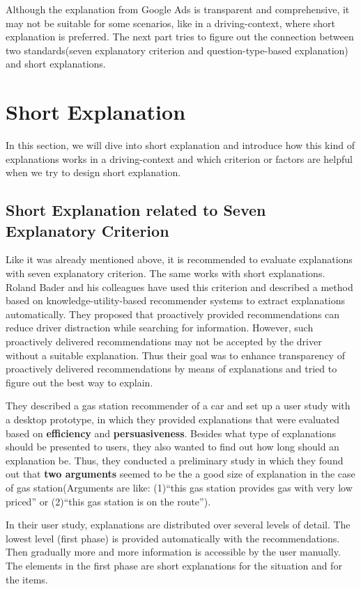         Although the explanation from Google Ads is transparent and comprehensive,
        it may not be suitable for some scenarios, like in a driving-context, where short explanation is preferred.
        The next part tries to figure out the connection between two standards(seven explanatory criterion and question-type-based explanation) 
        and short explanations.
\section{Short Explanation}
    In this section, we will dive into short explanation and introduce how this kind of explanations works in a driving-context
    and which criterion or factors are helpful when we try to design short explanation.
    \subsection{Short Explanation related to Seven Explanatory Criterion}
    \indent Like it was already mentioned above, 
    it is recommended to evaluate explanations with seven explanatory criterion. The same works with short explanations.
    Roland Bader and his colleagues have used this criterion and described a method based on knowledge-utility-based 
    recommender systems to extract explanations automatically\cite{bader122011explanations}. They proposed that 
    proactively provided recommendations can reduce driver distraction while searching for information. However, 
    such proactively delivered recommendations may not be accepted by the driver without a suitable explanation.
    Thus their goal was to enhance transparency of proactively delivered recommendations by means of explanations and
    tried to figure out the best way to explain.
    
    \indent They described a gas station recommender of a car and set up a user study with a desktop prototype, 
    in which they provided explanations that were evaluated based on \textbf{efficiency} and \textbf{persuasiveness}.
    Besides what type of explanations should be presented to users, they also wanted to find out how long should an explanation be.
    Thus, they conducted a preliminary study in which they found out that \textbf{two arguments} seemed to be the a good size of explanation
    in the case of gas station(Arguments are like: (1)``this gas station provides gas with very low priced'' or (2)``this gas station is on the route'').
    
    \indent In their user study, explanations are distributed over several levels of detail. 
    The lowest level (first phase) is provided automatically with the recommendations. 
    Then gradually more and more information is accessible by the user manually.
    The elements in the first phase are short explanations for the situation and for the items\cite{bader122011explanations}.
    
